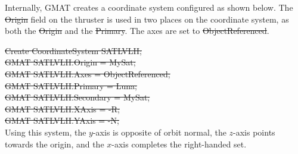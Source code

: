 Internally, GMAT creates a coordinate system configured as shown
below.  The \st{Origin} field on the thruster is used in two places
on the coordinate system, as both the \st{Origin} and the
\st{Primary}.  The axes are set to  \st{ObjectReferenced}.

\noindent\st{ Create CoordinateSystem SATLVLH;}\\
\st{ GMAT SATLVLH.Origin = MySat; }\\
\st{ GMAT SATLVLH.Axes = ObjectReferenced;}\\
\st{ GMAT SATLVLH.Primary = Luna;}\\
\st{ GMAT SATLVLH.Secondary = MySat;}\\
\st{ GMAT SATLVLH.XAxis = -R; }\\
\st{ GMAT SATLVLH.YAxis = -N; }\\

Using this system, the $y$-axis is opposite of orbit normal, the
$z$-axis points towards the origin, and the $x$-axis completes the
right-handed set.


\newpage





